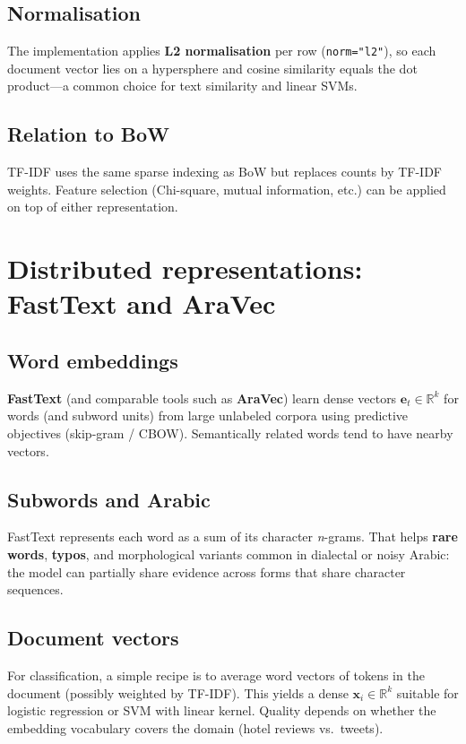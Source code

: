\documentclass[11pt,a4paper]{report}
\begin{document}
\subsection{Normalisation}
The implementation applies \textbf{L2 normalisation} per row (\texttt{norm="l2"}), so each document vector lies on a hypersphere and cosine similarity equals the dot product---a common choice for text similarity and linear SVMs.

\subsection{Relation to BoW}
TF-IDF uses the same sparse indexing as BoW but replaces counts by TF-IDF weights. Feature selection (Chi-square, mutual information, etc.) can be applied on top of either representation.

\section{Distributed representations: FastText and AraVec}

\subsection{Word embeddings}
\textbf{FastText} (and comparable tools such as \textbf{AraVec}) learn dense vectors $\mathbf{e}_t \in \mathbb{R}^{k}$ for words (and subword units) from large unlabeled corpora using predictive objectives (skip-gram / CBOW). Semantically related words tend to have nearby vectors.

\subsection{Subwords and Arabic}
FastText represents each word as a sum of its character \textit{n}-grams. That helps \textbf{rare words}, \textbf{typos}, and morphological variants common in dialectal or noisy Arabic: the model can partially share evidence across forms that share character sequences.

\subsection{Document vectors}
For classification, a simple recipe is to average word vectors of tokens in the document (possibly weighted by TF-IDF). This yields a dense $\mathbf{x}_i \in \mathbb{R}^{k}$ suitable for logistic regression or SVM with linear kernel. Quality depends on whether the embedding vocabulary covers the domain (hotel reviews vs.\ tweets).
\end{document}
